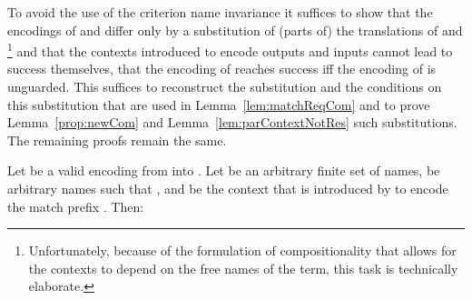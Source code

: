 \documentclass[]{article}
\begin{document}
To avoid the use of the criterion name invariance it suffices to show that the encodings of  and  differ only by a substitution of (parts of) the translations of  and \footnote{Unfortunately, because of the formulation of compositionality that allows for the contexts to depend on the free names of the term, this task is technically elaborate.} and that the contexts introduced to encode outputs and inputs cannot lead to success themselves, \ie that the encoding of  reaches success iff the encoding of  is unguarded. This suffices to reconstruct the substitution and the conditions on this substitution that are used in Lemma~\ref{lem:matchReqCom} and to prove Lemma~\ref{prop:newCom} and Lemma~\ref{lem:parContextNotRes} \wrt such substitutions. The remaining proofs remain the same.

\begin{lemma}
	\label{lem:matchReqCom}
	Let \encod be a valid encoding from \piT into \piNM.
	Let  be an arbitrary finite set of names,
	 be arbitrary names such that ,
	and  be the context that is introduced by  to encode the match prefix .
	Then:
	
\end{lemma}
\end{document}
